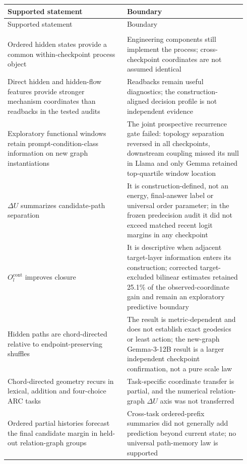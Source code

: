 \documentclass[10pt]{article}
\begin{document}
\fontsize{8}{9}\selectfont
\setlength{\tabcolsep}{2.5pt}
\renewcommand{\arraystretch}{1.08}
\begin{longtable}{@{}>{\RaggedRight\arraybackslash}p{0.470\linewidth}>{\RaggedRight\arraybackslash}p{0.470\linewidth}@{}}
\toprule
Supported statement & Boundary \\
\midrule
\endfirsthead
\toprule
Supported statement & Boundary \\
\midrule
\endhead
\midrule
\multicolumn{2}{r}{\footnotesize Continued on next page} \\
\endfoot
\bottomrule
\endlastfoot
Ordered hidden states provide a common within-checkpoint process object & Engineering components still implement the process; cross-checkpoint coordinates are not assumed identical \\
Direct hidden and hidden-flow features provide stronger mechanism coordinates than readbacks in the tested audits & Readbacks remain useful diagnostics; the construction-aligned decision profile is not independent evidence \\
Exploratory functional windows retain prompt-condition-class information on new graph instantiations & The joint prospective recurrence gate failed: topology separation reversed in all checkpoints, downstream coupling missed its null in Llama and only Gemma retained top-quartile window location \\
\(\Delta U\) summarizes candidate-path separation & It is construction-defined, not an energy, final-answer label or universal order parameter; in the frozen predecision audit it did not exceed matched recent logit margins in any checkpoint \\
\(O_l^{\mathrm{cont}}\) improves closure & It is descriptive when adjacent target-layer information enters its construction; corrected target-excluded bilinear estimates retained 25.1\% of the observed-coordinate gain and remain an exploratory predictive boundary \\
Hidden paths are chord-directed relative to endpoint-preserving shuffles & The result is metric-dependent and does not establish exact geodesics or least action; the new-graph Gemma-3-12B result is a larger independent checkpoint confirmation, not a pure scale law \\
Chord-directed geometry recurs in lexical, addition and four-choice ARC tasks & Task-specific coordinate transfer is partial, and the numerical relation-graph \(\Delta U\) axis was not transferred \\
Ordered partial histories forecast the final candidate margin in held-out relation-graph groups & Cross-task ordered-prefix summaries did not generally add prediction beyond current state; no universal path-memory law is supported \\

\end{longtable}
\end{document}
